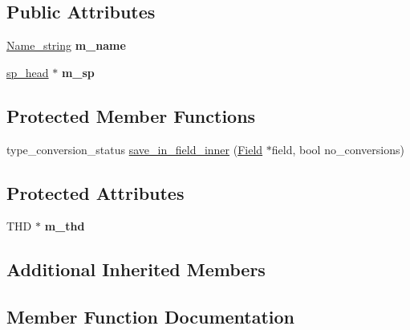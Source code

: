 \subsection*{Public Attributes}
\begin{DoxyCompactItemize}
\item 
\mbox{\label{classItem__sp__variable_a18010bd049f7745f0bcee90cbab5db23}} 
\mbox{\hyperlink{className__string}{Name\+\_\+string}} {\bfseries m\+\_\+name}
\item 
\mbox{\label{classItem__sp__variable_af486d9407549b3837d0d2ecf20e6df31}} 
\mbox{\hyperlink{classsp__head}{sp\+\_\+head}} $\ast$ {\bfseries m\+\_\+sp}
\end{DoxyCompactItemize}
\subsection*{Protected Member Functions}
\begin{DoxyCompactItemize}
\item 
type\+\_\+conversion\+\_\+status \mbox{\hyperlink{classItem__sp__variable_acb11aaf1fbb77e35dae0f8e977ae3294}{save\+\_\+in\+\_\+field\+\_\+inner}} (\mbox{\hyperlink{classField}{Field}} $\ast$field, bool no\+\_\+conversions)
\end{DoxyCompactItemize}
\subsection*{Protected Attributes}
\begin{DoxyCompactItemize}
\item 
\mbox{\label{classItem__sp__variable_a918014a50792f641ef86939b3f550615}} 
T\+HD $\ast$ {\bfseries m\+\_\+thd}
\end{DoxyCompactItemize}
\subsection*{Additional Inherited Members}


\subsection{Member Function Documentation}
\mbox{\label{classItem__sp__variable_acb11aaf1fbb77e35dae0f8e977ae3294}} 
